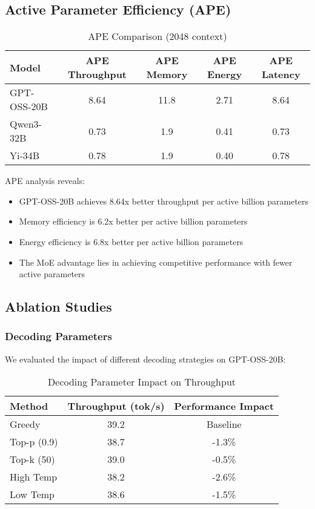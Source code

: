 \documentclass[11pt]{article}
\begin{document}
\subsection{Active Parameter Efficiency (APE)}

\begin{table}[h]
\centering
\caption{APE Comparison (2048 context)}
\begin{tabular}{lcccc}
\toprule
Model & APE Throughput & APE Memory & APE Energy & APE Latency \\
\midrule
GPT-OSS-20B & 8.64 & 11.8 & 2.71 & 8.64 \\
Qwen3-32B & 0.73 & 1.9 & 0.41 & 0.73 \\
Yi-34B & 0.78 & 1.9 & 0.40 & 0.78 \\
\bottomrule
\end{tabular}
\end{table}

APE analysis reveals:
\begin{itemize}
    \item GPT-OSS-20B achieves 8.64x better throughput per active billion parameters
    \item Memory efficiency is 6.2x better per active billion parameters
    \item Energy efficiency is 6.8x better per active billion parameters
    \item The MoE advantage lies in achieving competitive performance with fewer active parameters
\end{itemize}

\subsection{Ablation Studies}

\subsubsection{Decoding Parameters}

We evaluated the impact of different decoding strategies on GPT-OSS-20B:

\begin{table}[h]
\centering
\caption{Decoding Parameter Impact on Throughput}
\begin{tabular}{lcc}
\toprule
Method & Throughput (tok/s) & Performance Impact \\
\midrule
Greedy & 39.2 & Baseline \\
Top-p (0.9) & 38.7 & -1.3\% \\
Top-k (50) & 39.0 & -0.5\% \\
High Temp & 38.2 & -2.6\% \\
Low Temp & 38.6 & -1.5\% \\
\bottomrule
\end{tabular}
\end{table}
\end{document}

